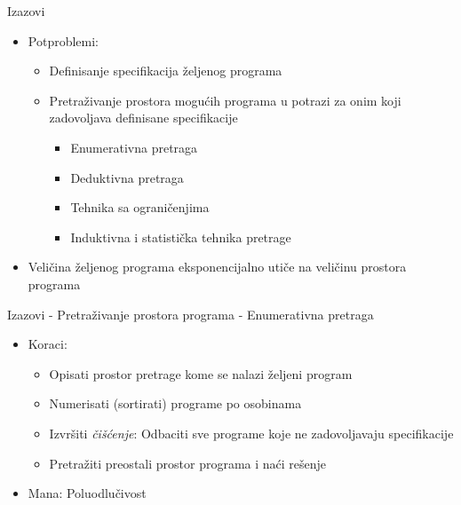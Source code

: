 

\begin{frame}{Izazovi}
    \begin{itemize}
        \item Potproblemi:
            \begin{itemize}
                \item Definisanje specifikacija željenog programa
                \item Pretraživanje prostora mogućih programa u potrazi za onim koji zadovoljava definisane specifikacije
                \begin{itemize}
                    \item Enumerativna pretraga
                    \item Deduktivna pretraga
                    \item Tehnika sa ograničenjima
                    \item Induktivna i statistička tehnika pretrage
                \end{itemize}
            \end{itemize}
        \item Veličina željenog programa eksponencijalno utiče na veličinu prostora programa
    \end{itemize}
\end{frame}


\begin{frame}{Izazovi - Pretraživanje prostora programa - Enumerativna pretraga}
    \begin{itemize}
        \item Koraci:
        \begin{itemize} 
            \item Opisati prostor pretrage kome se nalazi željeni program
            \item Numerisati (sortirati) programe po osobinama
            \item Izvršiti \emph{čišćenje}: Odbaciti sve programe koje ne zadovoljavaju specifikacije
            \item Pretražiti preostali prostor programa i naći rešenje
        \end{itemize}
        \item Mana: Poluodlučivost
    \end{itemize}
\end{frame}

